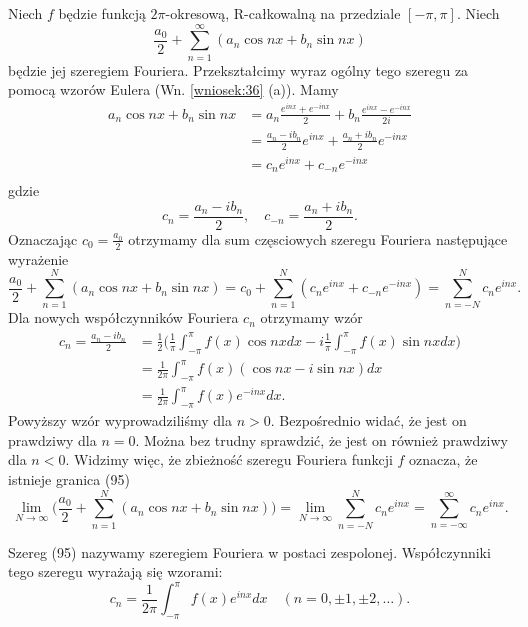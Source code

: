 \documentclass[leqno]{article}
\begin{document}
\begin{justify}
\noindent
Niech $f$ będzie funkcją $2\pi$-okresową, R-całkowalną na przedziale $[-\pi, \pi]$. Niech
\[
    \frac{a_0}{2} + \sum_{n=1}^{\infty}(a_n \cos nx + b_n \sin nx)
\]
będzie jej szeregiem Fouriera. Przekształcimy wyraz ogólny tego szeregu za pomocą wzorów Eulera (Wn. \ref{wniosek:36} (a)). Mamy
\begin{align*}
   a_n \cos nx + b_n \sin nx &= a_n \frac{e^{inx} + e^{-inx}}{2} + b_n \frac{e^{inx} - e^{-inx}}{2i} \\
                            &= \frac{a_n - ib_n}{2}e^{inx} + \frac{a_n + i b_n}{2}e^{-inx} \\
                            &= c_n e^{inx} + c_{-n}e^{-inx} \\
\end{align*}
gdzie
\[
    c_n = \frac{a_n - ib_n}{2}, \quad c_{-n} = \frac{a_n + i b_n}{2}.
\]
Oznaczając $c_0 = \frac{a_0}{2}$ otrzymamy dla sum częsciowych szeregu Fouriera następujące wyrażenie
\[
    \frac{a_0}{2} + \sum_{n=1}^{N}(a_n \cos nx + b_n \sin nx) = c_0 + \sum_{n=1}^{N}(c_n e^{inx} + c_{-n}e^{-inx}) = \sum_{n=-N}^{N}c_n e^{inx}.
\]
Dla nowych współczynników Fouriera $c_n$ otrzymamy wzór
\begin{align*}
    c_n = \frac{a_n - i b_n}{2} &= \frac{1}{2}\Big(\frac{1}{\pi}\int_{-\pi}^{\pi}f(x) \cos nx dx - i \frac{1}{\pi}\int_{-\pi}^{\pi} f(x) \sin nx dx \Big) \\
                               &= \frac{1}{2\pi}\int_{-\pi}^{\pi}f(x)(\cos nx - i \sin nx) dx \\ 
                               &= \frac{1}{2\pi} \int_{-\pi}^{\pi}f(x)e^{-inx}dx.
\end{align*}
Powyższy wzór wyprowadziliśmy dla $n > 0$. Bezpośrednio widać, że jest on prawdziwy dla $n = 0$. Można bez trudny sprawdzić, że jest on również prawdziwy dla $n < 0$.
Widzimy więc, że zbieżność szeregu Fouriera funkcji $f$ oznacza, że istnieje granica (95)
\[
    \lim_{N \to \infty} \Big( \frac{a_0}{2} + \sum_{n=1}^{N}(a_n \cos nx + b_n \sin nx)\Big) 
                                = \lim_{N \to \infty} \sum_{n=-N}^{N}c_n e^{inx}
                                = \sum_{n=-\infty}^{\infty}c_n e^{inx}.
\]

\begin{defn}
    Szereg (95) nazywamy szeregiem Fouriera w postaci zespolonej. Współczynniki tego szeregu wyrażają się wzorami:
    \[
        c_n = \frac{1}{2\pi}\int_{-\pi}^{\pi}f(x)e^{inx}dx \quad (n = 0, \pm 1, \pm 2, \ldots).
    \]
\end{defn}


\end{justify}
\end{document}
